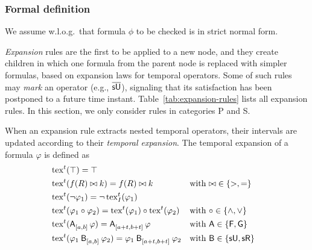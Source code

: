 \documentclass[acmsmall,screen]{acmart}
\begin{document}

\subsubsection{Formal definition}
\label{sec:basic-tableau-formal}
\color{black}
We assume w.l.o.g.\ that formula $\phi$ to be checked is in strict normal form.

\emph{Expansion} rules are the first to be applied to a new node,
and they create children in which one formula from the parent node is replaced with simpler formulas,
based on expansion laws for temporal operators.
Some of such rules may \emph{mark} an operator (e.g., $\marked{\suntilop}$),
signaling that its satisfaction has been postponed to a future time instant.
Table~\ref{tab:expansion-rules} lists all expansion rules.
In this section, we only consider rules in categories P and S.

When an expansion rule extracts nested temporal operators,
their intervals are updated according to their \emph{temporal expansion}.
The temporal expansion of a formula $\varphi$ is defined as
\begin{align*}
&\exp^t(\top) = \top \\
&\exp^t(f(R) \bowtie k) = f(R) \bowtie k && \text{with } \mathord{\bowtie} \in \set{>, =}\\
&\exp^t(\neg \varphi_1) = \neg \exp^t_I(\varphi_1) \\
&\exp^t(\varphi_1 \circ \varphi_2) = \exp^t(\varphi_1) \circ \exp^t(\varphi_2) && \text{with } \circ \in \set{\land, \lor} \\
&\exp^t(\anyunop{[a,b]}{\varphi}) = \anyunop{[a+t,b+t]}{\varphi} && \text{with } \mathsf{A} \in \set{\evenop, \globop} \\
&\exp^t(\anybinop{[a,b]}{\varphi_1}{\varphi_2}) = \anybinop{[a+t,b+t]}{\varphi_1}{\varphi_2} && \text{with } \mathsf{B} \in \set{\suntilop, \sreleaseop}
\end{align*}
\vspace{-1ex}
\end{document}
